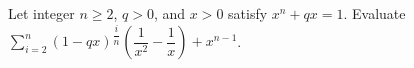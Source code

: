 Let integer $n\ge2$, $q>0$, and $x>0$ satisfy $x^n+qx=1$. Evaluate $\sum_{i=2}^n (1-qx)^{\dfrac{i}{n}} (\dfrac{1}{x^2} - \dfrac{1}{x}) + x^{n-1}$.
